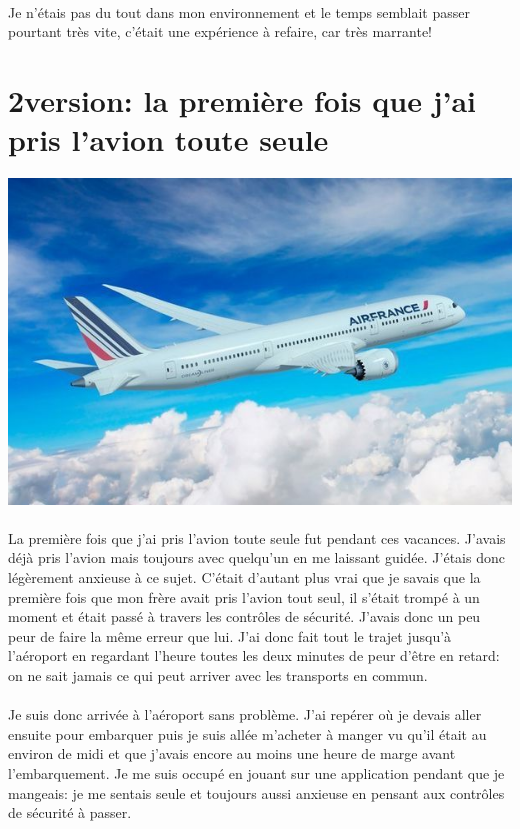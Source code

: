 \paragraph{} Je n'étais pas du tout dans mon environnement et le temps semblait
passer pourtant très vite, c'était une expérience à refaire, car très marrante!

\section[2\ieme version: l'avion]{2\ieme version: la première fois que j'ai pris l'avion toute seule}

\begin{center}
	\includegraphics[scale=0.6]{avion.jpg}
\end{center}

\paragraph{} La première fois que j'ai pris l'avion toute seule fut pendant ces
vacances. J'avais déjà pris l'avion mais toujours avec quelqu'un en me laissant
guidée. J'étais donc légèrement anxieuse à ce sujet. C'était d'autant plus vrai
que je savais que la première fois que mon frère avait pris l'avion tout seul,
il s'était trompé à un moment et était passé à travers les contrôles de
sécurité. J'avais donc un peu peur de faire la même erreur que lui. J'ai donc
fait tout le trajet jusqu'à l'aéroport en regardant l'heure toutes les deux
minutes de peur d'être en retard: on ne sait jamais ce qui peut arriver avec
les transports en commun.

\paragraph{} Je suis donc arrivée à l'aéroport sans problème. J'ai repérer où
je devais aller ensuite pour embarquer puis je suis allée m'acheter à manger vu
qu'il était au environ de midi et que j'avais encore au moins une heure de
marge avant l'embarquement. Je me suis occupé en jouant sur une application
pendant que je mangeais: je me sentais seule et toujours aussi anxieuse en
pensant aux contrôles de sécurité à passer.

